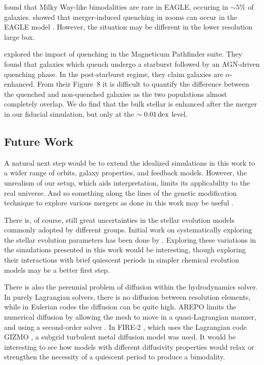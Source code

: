 \citet{2018MNRAS.477.5072M} found that Milky Way-like bimodalities are rare in EAGLE, occuring in $\sim5\%$ of galaxies. \citet{2021MNRAS.501..236D,2022MNRAS.515.1430D} showed that merger-induced quenching in zooms can occur in the EAGLE model \citep[see also][]{2017MNRAS.465..547P}. However, the situation may be different in the lower resolution large box.

\citet{2023arXiv231016085K} explored the impact of quenching in the Magneticum Pathfinder suite. They found that galaxies which quench undergo a starburst followed by an AGN-driven quenching phase. In the post-starburst regime, they claim galaxies are $\alpha$-enhanced. From their Figure~8 it is difficult to quantify the difference between the quenched and non-quenched galaxies as the two populations almost completely overlap. We do find that the bulk stellar \MgFe{} is enhanced after the merger in our fiducial simulation, but only at the $\sim0.01\,\textrm{dex}$ level.

\subsection{Future Work}
A natural next step would be to extend the idealized simulations in this work to a wider range of orbits, galaxy properties, and feedback models. However, the unrealism of our setup, which aids interpretation, limits its applicability to the real universe. And so something along the lines of the genetic modification technique to explore various mergers as done in this work may be useful \citep{2016MNRAS.455..974R,2017MNRAS.465..547P}.

There is, of course, still great uncertainties in the stellar evolution models commonly adopted by different groups. Initial work on systematically exploring the stellar evolution parameters has been done by \citet{2017A&A...605A..59R,2021MNRAS.508.3365B}. Exploring these variations in the simulations presented in this work would be interesting, though exploring their interactions with brief quiescent periods in simpler chemical evolution models may be a better first step.

There is also the perennial problem of diffusion within the hydrodynamics solver. In purely Lagrangian solvers, there is no diffusion between resolution elements, while in Eulerian codes the diffusion can be quite high. AREPO limits the numerical diffusion by allowing the mesh to move in a quasi-Lagrangian manner, and using a second-order solver . In FIRE-2 \citep{2018MNRAS.480..800H}, which uses the Lagrangian code GIZMO \citep{2015MNRAS.450...53H}, a subgrid turbulent metal diffusion model was used. It would be interesting to see how models with different diffusivity properties would relax or strengthen the necessity of a quiescent period to produce a bimodality.

